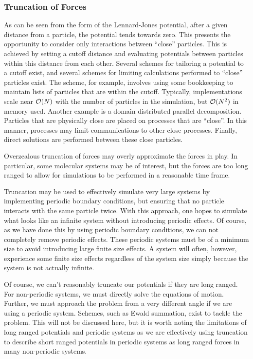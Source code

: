 \subsubsection{Truncation of Forces}
%
As can be seen from the form of the Lennard-Jones potential,
after a given distance from a particle, the potential tends towards
zero.
%
This presents the opportunity to consider only interactions between
``close'' particles.
%
This is achieved by setting a cutoff distance and evaluating potentials
between particles within this distance from each other.
%
Several schemes for tailoring a potential to a cutoff exist, and several
schemes for limiting calculations performed to ``close'' particles
exist.
%
The \verletlist{} scheme, for example, involves using some bookkeeping to
maintain lists of particles that are within the cutoff.
%
Typically, \verletlist{} implementations scale near $\mathcal{O}{(N)}$ with the
number of particles in the simulation, but $\mathcal{O}{(N^2)}$ in memory used.
%
Another example is a domain distributed parallel decomposition.
%
Particles that are physically close are placed on processes that are ``close''.
%
In this manner, processes may limit communications to other close processes.
%
Finally, direct solutions are performed between these close particles.

%
Overzealous truncation of forces may overly approximate the forces in play.
%
In particular, some molecular systems may be of interest, but the forces
are too long ranged to allow for simulations to be performed in
a reasonable time frame.

%
Truncation may be used to effectively simulate very large
systems by implementing periodic boundary conditions, but ensuring
that no particle interacts with the same particle twice.
%
With this approach, one hopes to simulate what looks like an infinite system
without introducing periodic effects.
%
Of course, as we have done this by using periodic boundary conditions,
we can not completely remove periodic effects.
%
These periodic systems must be of a minimum size to avoid introducing
large finite size effects.
%
A system will often, however, experience some finite size effects
regardless of the system size simply because the system is not actually
infinite.

%
Of course, we can't reasonably truncate our potentials if they are long ranged.
%
For non-periodic systems, we must directly solve the equations of motion.
%
Further, we must approach the problem from a very different angle if we
are using a periodic system.
%
Schemes, such as Ewald summation, exist to tackle the problem.
%
This will not be discussed here, but it is worth noting the limitations of
long ranged potentials and periodic systems as we are effectively using
truncation to describe short ranged potentials in periodic systems as
long ranged forces in many non-periodic systems.



